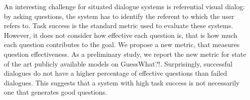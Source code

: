 An interesting challenge for situated dialogue systems is referential visual dialog: by asking questions, the system has to identify the referent to which the user refers to. Task success is the standard metric used to evaluate these systems. However, it does not consider how effective each question is, that is how much each question contributes to the goal. We propose a new metric, that measures question effectiveness. As a preliminary study, we report the new metric for state of the art publicly available models on GuessWhat?!. Surprisingly, successful dialogues do not have a higher percentage of effective questions than failed dialogues. This suggests that a system with high task success is not necessarily one that generates good questions.
